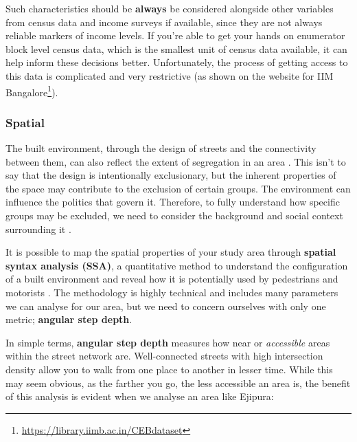 \documentclass[
]{latex/krantz}
\renewcommand{\href}[2]{#2\footnote{\url{#1}}}
\DeclareRobustCommand{\href}[2]{#2\footnote{\url{#1}}}
\begin{document}
Such characteristics should be \textbf{always} be considered alongside other variables from census data and income surveys if available, since they are not always reliable markers of income levels. If you're able to get your hands on enumerator block level census data, which is the smallest unit of census data available, it can help inform these decisions better. Unfortunately, the process of getting access to this data is complicated and very restrictive (as shown \href{https://library.iimb.ac.in/CEBdataset}{on the website for IIM Bangalore}).

\hypertarget{spatial}{%
\subsubsection{Spatial}\label{spatial}}

The built environment, through the design of streets and the connectivity between them, can also reflect the extent of segregation in an area \autocite{vlachouSuccessionalSegregationGerani2015}. This isn't to say that the design is intentionally exclusionary, but the inherent properties of the space may contribute to the exclusion of certain groups. The environment can influence the politics that govern it. Therefore, to fully understand how specific groups may be excluded, we need to consider the background and social context surrounding it \autocite{winnerArtifactsHavePolitics1980}.

It is possible to map the spatial properties of your study area through \textbf{spatial syntax analysis (SSA)}, a quantitative method to understand the configuration of a built environment and reveal how it is potentially used by pedestrians and motorists \autocite{dettlaffSpaceSyntaxAnalysis}. The methodology is highly technical and includes many parameters we can analyse for our area, but we need to concern ourselves with only one metric; \textbf{angular step depth}.

In simple terms, \textbf{angular step depth} measures how near or \emph{accessible} areas within the street network are. Well-connected streets with high intersection density allow you to walk from one place to another in lesser time. While this may seem obvious, as the farther you go, the less accessible an area is, the benefit of this analysis is evident when we analyse an area like Ejipura:
\end{document}
